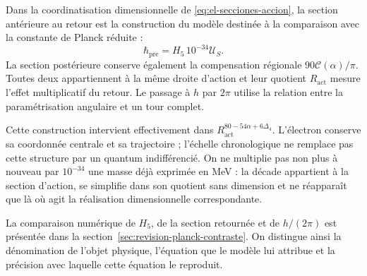 Dans la coordinatisation dimensionnelle de \eqref{eq:el-secciones-accion}, la section
antérieure au retour est la construction du modèle destinée à la comparaison
avec la constante de Planck réduite :
\[
 \hbar_{\mathrm{pre}}=H_5\,10^{-34}\mathcal U_S.
\]
La section postérieure conserve également la compensation régionale
\(90\mathscr C(\alpha)/\pi\). Toutes deux appartiennent à la même droite
d'action et leur quotient \(R_{\mathrm{act}}\) mesure l'effet multiplicatif
du retour. Le passage à \(h\) par \(2\pi\) utilise la relation
entre la paramétrisation angulaire et un tour complet.

Cette construction intervient effectivement dans
\(R_{\mathrm{act}}^{80-54\alpha+6\Delta_4}\). L'électron conserve
sa coordonnée centrale et sa trajectoire ; l'échelle chronologique ne
remplace pas cette structure par un quantum indifférencié. On ne
multiplie pas non plus à nouveau par \(10^{-34}\) une masse déjà exprimée en MeV :
la décade appartient à la section d'action, se simplifie dans son quotient
sans dimension et ne réapparaît que là où agit la réalisation
dimensionnelle correspondante.

La comparaison numérique de \(H_5\), de la section retournée et de
\(h/(2\pi)\) est présentée dans la section~\ref{sec:revision-planck-contraste}.
On distingue ainsi la dénomination de l'objet physique, l'équation que le
modèle lui attribue et la précision avec laquelle cette équation le reproduit.
